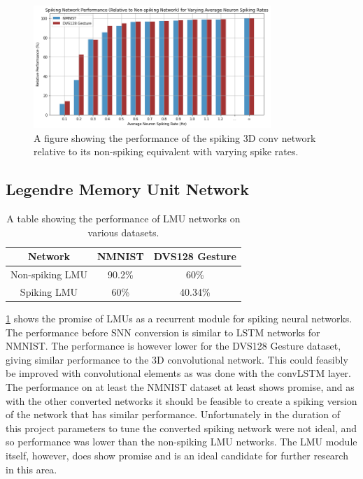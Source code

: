 \begin{figure}[htb]
    \centering
    \includegraphics[width=0.8\textwidth]{testingandresults/images/spiking_perfromace_with_varying_spike_rate.png}
    \caption{A figure showing the performance of the spiking 3D conv network relative to its non-spiking equivalent with varying spike rates.}
    \label{fig:spiking_perfromace_with_varying_spike_rate}
\end{figure}

\subsection{Legendre Memory Unit Network}

\begin{table}[htb]
    \centering
    \begin{tabular}{|| c | c | c ||}
        \hline
        Network     & NMNIST & DVS128 Gesture \\
        \hline \hline
        Non-spiking LMU        &  90.2\%    &    60\%  \\
        \hline
        Spiking LMU        &  60\%    &   40.34\%   \\
        \hline
    \end{tabular}
    \caption{A table showing the performance of LMU networks on various datasets.}
    \label{tab:lmu_performance}
\end{table}

\cref{tab:lmu_performance} shows the promise of LMUs as a recurrent module for spiking neural networks. The performance before SNN conversion is similar to LSTM networks for NMNIST. The performance is however lower for the DVS128 Gesture dataset, giving similar performance to the 3D convolutional network. This could feasibly be improved with convolutional elements as was done with the convLSTM layer. The performance on at least the NMNIST dataset at least shows promise, and as with the other converted networks it should be feasible to create a spiking version of the network that has similar performance. Unfortunately in the duration of this project parameters to tune the converted spiking network were not ideal, and so performance was lower than the non-spiking LMU networks. The LMU module itself, however, does show promise and is an ideal candidate for further research in this area.
